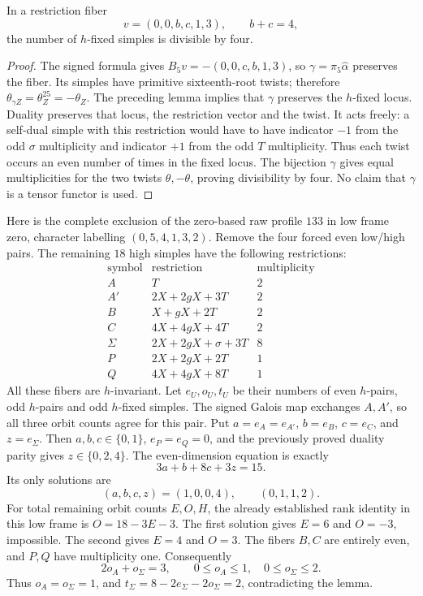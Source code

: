 \begin{lemma}
In a restriction fiber
\[
 v=(0,0,b,c,1,3),\qquad b+c=4,
\]
the number of $h$-fixed simples is divisible by four.
\end{lemma}
\begin{proof}
The signed formula gives
$B_5v=-(0,0,c,b,1,3)$, so
$\gamma=\pi_5\widehat\alpha$ preserves the fiber.
Its simples have primitive sixteenth-root twists; therefore
$\theta_{\gamma Z}=\theta_Z^{25}=-\theta_Z$.
The preceding lemma implies that $\gamma$ preserves the $h$-fixed locus.
Duality preserves that locus, the restriction vector and the twist.
It acts freely: a self-dual simple with this restriction would have to
have indicator $-1$ from the odd $\sigma$ multiplicity and indicator
$+1$ from the odd $T$ multiplicity.  Thus each twist occurs an even
number of times in the fixed locus.  The bijection $\gamma$ gives equal
multiplicities for the two twists $\theta,-\theta$, proving divisibility
by four.  No claim that $\gamma$ is a tensor functor is used.
\end{proof}

Here is the complete exclusion of the zero-based raw profile $133$ in
low frame zero, character labelling $(0,5,4,1,3,2)$.
Remove the four forced even low/high pairs.  The remaining $18$ high
simples have the following restrictions:
\[
\begin{array}{c|c|c}
\text{symbol}&\text{restriction}&\text{multiplicity}\\\hline
A&T&2\\
A'&2X+2gX+3T&2\\
B&X+gX+2T&2\\
C&4X+4gX+4T&2\\
\Sigma&2X+2gX+\sigma+3T&8\\
P&2X+2gX+2T&1\\
Q&4X+4gX+8T&1
\end{array}
\]
All these fibers are $h$-invariant.  Let $e_U,o_U,t_U$ be their numbers
of even $h$-pairs, odd $h$-pairs and odd $h$-fixed simples.  The signed
Galois map exchanges $A,A'$, so all three orbit counts agree for this
pair.  Put $a=e_A=e_{A'}$, $b=e_B$, $c=e_C$, and $z=e_\Sigma$.
Then $a,b,c\in\{0,1\}$, $e_P=e_Q=0$, and the previously proved duality
parity gives $z\in\{0,2,4\}$.  The even-dimension equation is exactly
\[
 3a+b+8c+3z=15.
\]
Its only solutions are
\[
 (a,b,c,z)=(1,0,0,4),\qquad(0,1,1,2).
\]
For total remaining orbit counts $E,O,H$, the already established rank
identity in this low frame is $O=18-3E-3$.  The first solution gives
$E=6$ and $O=-3$, impossible.  The second gives $E=4$ and $O=3$.
The fibers $B,C$ are entirely even, and $P,Q$ have multiplicity one.
Consequently
\[
 2o_A+o_\Sigma=3,\qquad 0\leq o_A\leq1,\quad
 0\leq o_\Sigma\leq2.
\]
Thus $o_A=o_\Sigma=1$, and
$t_\Sigma=8-2e_\Sigma-2o_\Sigma=2$, contradicting the lemma.

